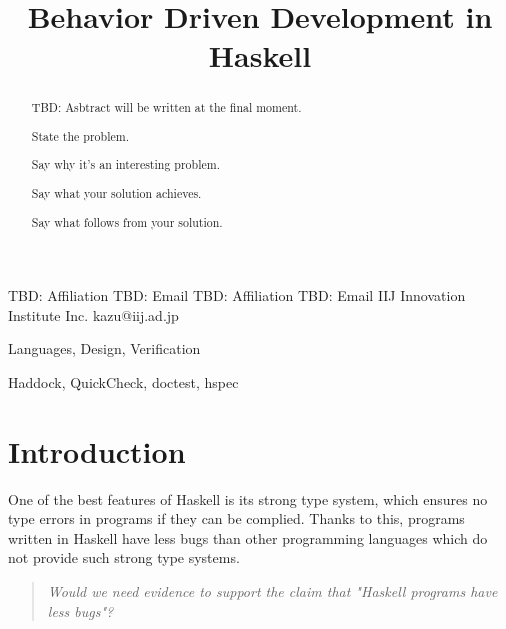 \documentclass[preprint]{sigplanconf}
\begin{document}
\copyrightdata{[to be supplied]}


\title{Behavior Driven Development in Haskell}

           {TBD: Affiliation}
           {TBD: Email}
           {TBD: Affiliation}
           {TBD: Email}
           {IIJ Innovation Institute Inc.}
           {kazu@iij.ad.jp}

\maketitle

\begin{abstract}

TBD: Asbtract will be written at the final moment.

State the problem.

Say why it’s an interesting problem.

Say what your solution achieves.

Say what follows from your solution.

\end{abstract}


\terms Languages, Design, Verification

\keywords Haddock, QuickCheck, doctest, hspec

\section{Introduction}


One of the best features of Haskell is its strong type system, 
which ensures no type errors in programs if they can be complied.
Thanks to this, programs written in Haskell have less bugs
than other programming languages which do not provide such strong type systems.

\begin{quote}
    \emph{Would we need evidence to support the claim that "Haskell programs have less bugs"?}
\end{quote}
\end{document}
